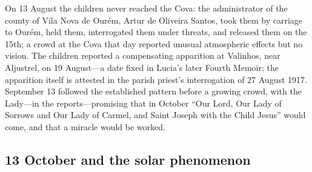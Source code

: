 On 13 August the children never reached the Cova: the administrator of
the county of Vila Nova de Our\'em, Artur de Oliveira Santos, took
them by carriage to Our\'em, held them, interrogated them under
threats, and released them on the 15th; a crowd at the Cova that day
reported unusual atmospheric effects but no vision. The children
reported a compensating apparition at Valinhos, near Aljustrel, on
19 August---a date fixed in Lucia's later Fourth Memoir; the
apparition itself is attested in the parish priest's interrogation of
27 August 1917. September
13 followed the established pattern before a growing crowd, with the
Lady---in the reports---promising that in October ``Our Lord, Our
Lady of Sorrows and Our Lady of Carmel, and Saint Joseph with the
Child Jesus'' would come, and that a miracle would be worked.

\subsection{13 October and the solar phenomenon}

